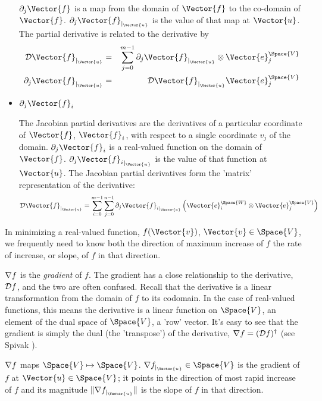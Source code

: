 \begin{itemize}
$\da{j}{\Vector{f}}$ is a map from the domain of $\Vector{f}$ to the co-domain of $\Vector{f}$.
$\db{j}{\Vector{f}}{\Vector{u}}$ is the value of that map at $\Vector{u}$.
The partial derivative is related to the derivative by
\begin{eqnarray}
\label{eq:partial-full-dervatives}
\Db{\Vector{f}}{\Vector{u}}
& = &
\sum_{j=0}^{m-1} \db{j}{\Vector{f}}{\Vector{u}} \otimes \Vector{e}_j^{\Space{V}}
\\
\db{j}{\Vector{f}}{\Vector{u}}
& = &
\Db{\Vector{f}}{\Vector{u}} \Vector{e}_j^{\Space{V}}
\nonumber
\end{eqnarray}

\item $\da{j}{\Vector{f}_i}$

The Jacobian partial derivatives are the derivatives of
a particular coordinate of $\Vector{f}$, $\Vector{f}_i$, with respect to
a single coordinate $v_j$ of the domain.
$\da{j}{\Vector{f}_i}$ is a real-valued function on the domain of $\Vector{f}$.
$\db{j}{\Vector{f}_i}{\Vector{u}}$ is the value of that function at $\Vector{u}$.
The Jacobian partial derivatives form the 'matrix' representation of the derivative:
\begin{equation}
\Db{\Vector{f}}{\Vector{u}} =
\sum_{i=0}^{m-1}
\sum_{j=0}^{n-1}
\db{j}{\Vector{f}_i}{\Vector{u}} \left( \Vector{e}_i^{\Space{W}} \otimes \Vector{e}_j^{\Space{V}} \right)
\end{equation}

\end{itemize}

In minimizing a real-valued function, $f(\Vector{v})$, $\Vector{v} \in \Space{V}$,
we frequently need to know both the direction of maximum increase of $f$
the rate of increase, or slope, of $f$ in that direction.

${\mathbf \nabla}{f}$ is the {\it gradient} of $f$.
The gradient has a close relationship to the derivative, ${\mathcal{D}{f}}$,
and the two are often confused.
Recall that the derivative is a linear transformation
from the domain of $f$ to its codomain.
In the case of real-valued functions,
this means the derivative is a linear function on $\Space{V}$,
an element of the dual space of $\Space{V}$, a 'row' vector.
It's easy to see that the gradient is simply the dual (the 'transpose')
of the derivative, ${\mathbf \nabla}{f} = ({\mathcal{D}{f}})^{\dagger}$
(see Spivak \cite[p.~96, ex.~4-18]{Spivak:1965:CalculusOnManifolds}).

${\mathbf \nabla}{f}$ maps $\Space{V} \mapsto \Space{V}$.
$\Gb{f}{\Vector{u}} \in \Space{V}$ is the gradient of $f$ at $\Vector{u} \in \Space{V}$;
it points in the direction of most rapid increase of
$f$ and its magnitude $\| \Gb{f}{\Vector{u}} \|$ is the
slope of $f$ in that direction.

